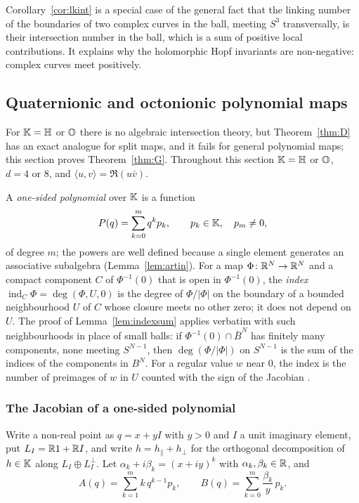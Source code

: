 \begin{remark}
Corollary~\ref{cor:lkint} is a special case of the general fact that the linking number of the boundaries of two complex curves in the ball, meeting $S^3$ transversally, is their intersection number in the ball, which is a sum of positive local contributions. It explains why the holomorphic Hopf invariants are non-negative: complex curves meet positively.
\end{remark}

\subsection{Quaternionic and octonionic polynomial maps}\label{sec:split}

For $\mathbb{K}=\mathbb{H}$ or $\mathbb{O}$ there is no algebraic intersection theory, but Theorem~\ref{thm:D} has an exact analogue for split maps, and it fails for general polynomial maps; this section proves Theorem~\ref{thm:G}. Throughout this section $\mathbb{K}=\mathbb{H}$ or $\mathbb{O}$, $d=4$ or $8$, and $\langle u,v\rangle=\Re(u\bar v)$.

A \emph{one-sided polynomial} over $\mathbb{K}$ is a function
\begin{equation}\label{eq:onesided}
P(q)=\sum_{k=0}^mq^kp_k,\qquad p_k\in\mathbb{K},\quad p_m\neq0,
\end{equation}
of degree $m$; the powers are well defined because a single element generates an associative subalgebra (Lemma~\ref{lem:artin}). For a map $\Phi\colon\mathbb{R}^N\to\mathbb{R}^N$ and a compact component $C$ of $\Phi^{-1}(0)$ that is open in $\Phi^{-1}(0)$, the \emph{index} $\operatorname{ind}_C\Phi=\deg(\Phi,U,0)$ is the degree of $\Phi/|\Phi|$ on the boundary of a bounded neighbourhood $U$ of $C$ whose closure meets no other zero; it does not depend on $U$. The proof of Lemma~\ref{lem:indexsum} applies verbatim with such neighbourhoods in place of small balls: if $\Phi^{-1}(0)\cap\bar B^N$ has finitely many components, none meeting $S^{N-1}$, then $\deg(\Phi/|\Phi|)$ on $S^{N-1}$ is the sum of the indices of the components in $B^N$. For a regular value $w$ near $0$, the index is the number of preimages of $w$ in $U$ counted with the sign of the Jacobian \cite[Section~5]{Mil65}.

\subsubsection{The Jacobian of a one-sided polynomial}

Write a non-real point as $q=x+yI$ with $y>0$ and $I$ a unit imaginary element, put $L_I=\mathbb{R}1+\mathbb{R} I$, and write $h=h_\parallel+h_\perp$ for the orthogonal decomposition of $h\in\mathbb{K}$ along $L_I\oplus L_I^\perp$. Let $\alpha_k+i\beta_k=(x+iy)^k$ with $\alpha_k,\beta_k\in\mathbb{R}$, and
\begin{equation}\label{eq:AB}
A(q)=\sum_{k=1}^mk\,q^{k-1}p_k,\qquad B(q)=\sum_{k=0}^m\frac{\beta_k}{y}\,p_k .
\end{equation}

